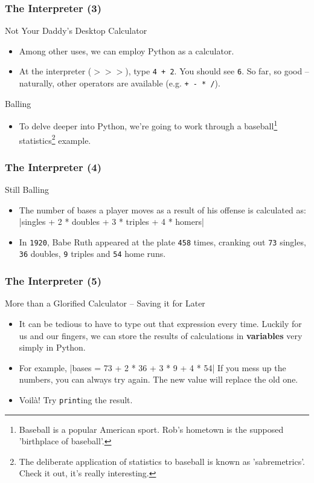 \documentclass[10pt]{beamer}
\begin{document}
\begin{frame}
  \frametitle{The Interpreter (3)}
  \begin{block}{Not Your Daddy's Desktop Calculator}
    \begin{itemize}
      \item Among other uses, we can employ Python as a calculator.
      \item At the interpreter (\texttt{$>>>$}), type \texttt{4 + 2}.
        You should see \texttt{6}.
        So far, so good -- naturally, other operators are available (e.g. \texttt{+ - * /}).
    \end{itemize}
  \end{block}
  \begin{block}{Balling}
    \begin{itemize}
      \item To delve deeper into Python, we're going to work through a baseball\footnote{Baseball is a popular American sport. Rob's hometown is the supposed 'birthplace of baseball'.} statistics\footnote{The deliberate application of statistics to baseball is known as 'sabremetrics'. Check it out, it's really interesting.} example.
    \end{itemize}
  \end{block}
\end{frame}

\begin{frame}[fragile]
  \frametitle{The Interpreter (4)}
  \begin{block}{Still Balling}
    \begin{itemize}
      \item The number of bases a player moves as a result of his offense is calculated as:  
      |singles + 2 * doubles + 3 * triples + 4 * homers|
      \item In \texttt{1920}, Babe Ruth appeared at the plate \texttt{458} times, cranking out \texttt{73} singles, \texttt{36} doubles, \texttt{9} triples and \texttt{54} home runs.    
    \end{itemize}
  \end{block}
\end{frame}

\begin{frame}
  \frametitle{The Interpreter (5)}
  \begin{block}{More than a Glorified Calculator -- Saving it for Later}
    \begin{itemize}
      \item It can be tedious to have to type out that expression every time.
        Luckily for us and our fingers, we can store the results of calculations in \textbf{variables} very simply in Python.
      \item For example, |bases = 73 + 2 * 36 + 3 * 9 + 4 * 54|
        If you mess up the numbers, you can always try again.
        The new value will replace the old one.
      \item Voil\`{a}! Try \texttt{print}ing the result.
    \end{itemize}
  \end{block}
\end{frame}
\end{document}
